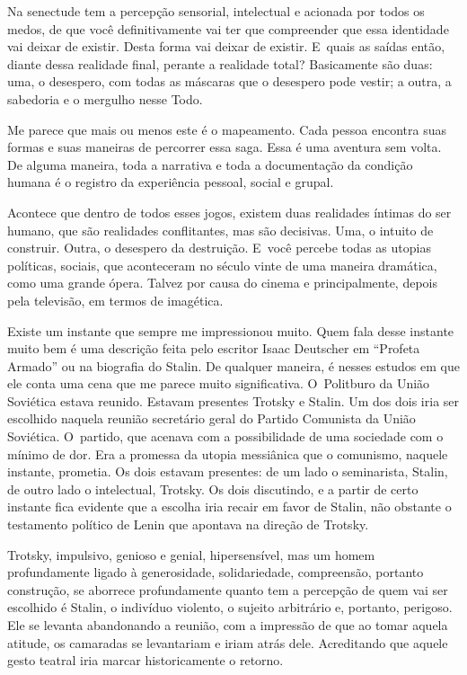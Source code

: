  

Na senectude tem a percepção sensorial, intelectual e acionada por todos
os medos, de que você definitivamente vai ter que compreender que essa
identidade vai deixar de existir. Desta forma vai deixar de existir. E~quais as saídas então, diante dessa realidade final, perante a realidade
total? Basicamente são duas: uma, o desespero, com todas as máscaras que
o desespero pode vestir; a outra, a sabedoria e o mergulho nesse Todo.

Me parece que mais ou menos este é o mapeamento. Cada pessoa encontra
suas formas e suas maneiras de percorrer essa saga. Essa é uma aventura
sem volta. De alguma maneira, toda a narrativa e toda a documentação da
condição humana é o registro da experiência pessoal, social e grupal.

 

Acontece que dentro de todos esses jogos, existem duas realidades
íntimas do ser humano, que são realidades conflitantes, mas são
decisivas. Uma, o intuito de construir. Outra, o desespero da
destruição. E~você percebe todas as utopias políticas, sociais, que
aconteceram no século vinte de uma maneira dramática, como uma grande
ópera. Talvez por causa do cinema e principalmente, depois pela
televisão, em termos de imagética.

 

Existe um instante que sempre me impressionou muito. Quem fala desse
instante muito bem é uma descrição feita pelo escritor Isaac Deutscher
em ``Profeta Armado'' ou na biografia do Stalin. De qualquer maneira, é
nesses estudos em que ele conta uma cena que me parece muito
significativa. O~Politburo da União Soviética estava reunido. Estavam
presentes Trotsky e Stalin. Um dos dois iria ser escolhido naquela
reunião secretário geral do Partido Comunista da União Soviética. O~partido, que acenava com a possibilidade de uma sociedade com o mínimo
de dor. Era a promessa da utopia messiânica que o comunismo, naquele
instante, prometia. Os dois estavam presentes: de um lado o seminarista,
Stalin, de outro lado o intelectual, Trotsky. Os dois discutindo, e a
partir de certo instante fica evidente que a escolha iria recair em
favor de Stalin, não obstante o testamento político de Lenin que
apontava na direção de Trotsky.

 

Trotsky, impulsivo, genioso e genial, hipersensível, mas um homem
profundamente ligado à generosidade, solidariedade, compreensão,
portanto construção, se aborrece profundamente quanto tem a percepção de
quem vai ser escolhido é Stalin, o indivíduo violento, o sujeito
arbitrário e, portanto, perigoso. Ele se levanta abandonando a reunião,
com a impressão de que ao tomar aquela atitude, os camaradas se
levantariam e iriam atrás dele. Acreditando que aquele gesto teatral
iria marcar historicamente o retorno.


